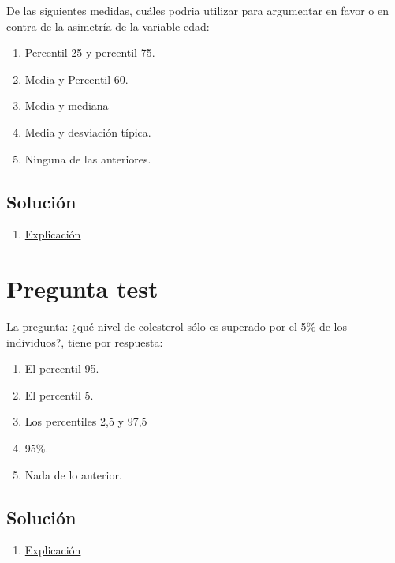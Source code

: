 \documentclass[
]{book}
\providecommand{\tightlist}{%
  \setlength{\itemsep}{0pt}\setlength{\parskip}{0pt}}
\begin{document}
De las siguientes medidas, cuáles podria utilizar para argumentar en favor o en contra de la asimetría de la variable edad:

\begin{enumerate}
\def\labelenumi{\alph{enumi})}
\tightlist
\item
  Percentil 25 y percentil 75.
\item
  Media y Percentil 60.
\item
  Media y mediana
\item
  Media y desviación típica.
\item
  Ninguna de las anteriores.
\end{enumerate}

\hypertarget{soluciuxf3n-36}{%
\subsection{Solución}\label{soluciuxf3n-36}}

\begin{enumerate}
\def\labelenumi{\alph{enumi})}
\setcounter{enumi}{2}
\tightlist
\item
  \href{https://1fjmanzano.github.io/bioestadistica/medidas-de-forma.html}{Explicación}
\end{enumerate}

\hypertarget{pregunta-test-35}{%
\section{Pregunta test}\label{pregunta-test-35}}

La pregunta: ¿qué nivel de colesterol sólo es superado por el 5\% de los individuos?, tiene por respuesta:

\begin{enumerate}
\def\labelenumi{\alph{enumi})}
\tightlist
\item
  El percentil 95.
\item
  El percentil 5.
\item
  Los percentiles 2,5 y 97,5
\item
  95\%.
\item
  Nada de lo anterior.
\end{enumerate}

\hypertarget{soluciuxf3n-37}{%
\subsection{Solución}\label{soluciuxf3n-37}}

\begin{enumerate}
\def\labelenumi{\alph{enumi})}
\tightlist
\item
  \href{https://1fjmanzano.github.io/bioestadistica/medidas-de-posicio\%CC\%81n-dispersio\%CC\%81n-y-forma.html\#medidas-de-posicio\%CC\%81n-no-centrales}{Explicación}
\end{enumerate}
\end{document}
